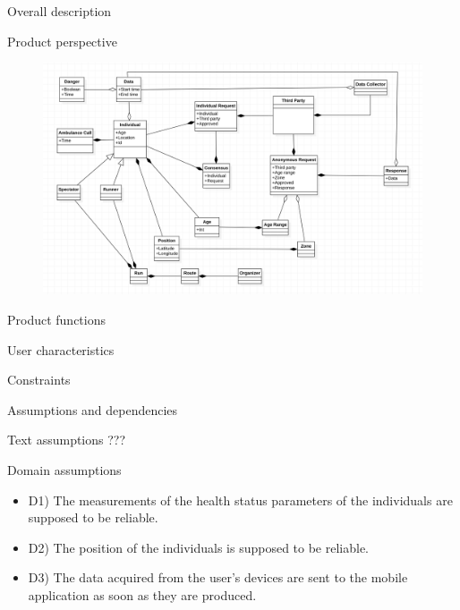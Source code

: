 \documentclass{article}
\begin{document}
\begin{legal}
		
    		
		
	
\newpage
 	\item {Overall description}
  		\begin{legal}
    		\item Product perspective\\
			\begin{figure}[H]
  			\includegraphics[width=\linewidth]{./images/UML1-0.png}
			\end{figure}
		\item Product functions \\
		\item User characteristics \\
		\item Constraints \\
		\item Assumptions and dependencies \\
			\begin{legal}
    			\item Text assumptions ??? \\
			\item Domain assumptions \\
			{\normalfont
				\begin{itemize}
				\item D1) The measurements of the health status parameters of the individuals are supposed to be reliable.  \\
				\item D2) The position of the individuals is supposed to be reliable.\\
				\item D3) The data acquired from the user’s devices are sent to the mobile application as soon as they are produced.\\

\end{itemize}}
\end{legal}
\end{legal}
\end{legal}
\end{document}
